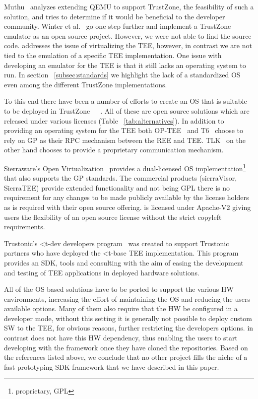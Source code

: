 \documentclass[10pt,conference,letterpaper]{IEEEtran}
\newcommand{\opentee}{\protect{TEE-Vi}\xspace}
\newcommand{\opentee}{\protect{Open-TEE}\xspace}
\begin{document}
Muthu~\cite{thesis:QEMU} analyzes extending QEMU to support TrustZone, the feasibility of such a solution, and tries to determine if it would be beneficial to the developer community. Winter et al.~\cite{WinterWPT11} go one step further and implement a TrustZone emulator as an open source project. However, we were not able to find the source code. \opentee addresses the issue of virtualizing the TEE, however, in contrast we are not tied to the emulation of a specific TEE implementation. One issue with developing an emulator for the TEE is that it still lacks an operating system to run. In section ~\ref{subsec:standards} we highlight the lack of a standardized OS even among the different TrustZone implementations.

To this end there have been a number of efforts to create an OS that is suitable to be deployed in TrustZone~\cite{web:NVIDIA_TLK}~\cite{web:linaro_op_tee}~\cite{web:T6}. All of these are open source solutions which are released under various licenses (Table ~\ref{tab:alternatives}). In addition to providing an operating system for the TEE both OP-TEE~\cite{web:linaro_op_tee} and T6~\cite{web:T6} choose to rely on GP as their RPC mechanism between the REE and TEE. TLK~\cite{web:NVIDIA_TLK} on the other hand chooses to provide a proprietary communication mechanism.

Sierraware's Open Virtualization~\cite{web:openVirtua} provides a dual-licensed OS implementation\footnote{proprietary, GPL} that also supports the GP standards. The commercial products (sierraVisor, SierraTEE) provide extended functionality and not being GPL there is no requirement for any changes to be made  publicly available by the license holders as is required with their open source offering. \opentee is licensed under Apache-V2 giving users the flexibility of an open source license without the strict copyleft requirements.

Trustonic's <t-dev developers program~\cite{web:trustonic_t_dev} was created to support Trustonic partners who have deployed the <t-base TEE implementation. This program provides an SDK, tools and consulting with the aim of easing the development and testing of TEE applications in deployed hardware solutions.

All of the OS based solutions have to be ported to support the various HW environments, increasing the effort of maintaining the OS and reducing the users available options.  Many of them also require that the HW be configured in a developer mode, without this setting it is generally not possible to deploy custom SW to the TEE, for obvious reasons, further restricting the developers options.  \opentee in contrast does not have this HW dependency, thus enabling the users to start developing with the framework once they have cloned the repositories. Based on the references listed above, we conclude that no other project fills the niche of a fast prototyping SDK framework that we have described in this paper.
\end{document}
